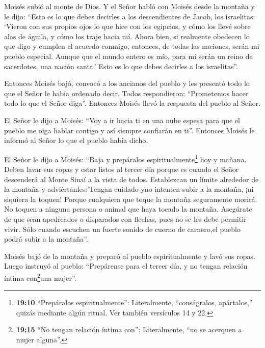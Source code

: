  Moisés subió al monte de Dios. Y el Señor habló con Moisés
desde la montaña y le dijo: ``Esto es lo que debes decirles a los
descendientes de Jacob, los israelitas:  `Vieron con sus
propios ojos lo que hice con los egipcios, y cómo los llevé sobre alas
de águila, y cómo los traje hacia mí.  Ahora bien, si
realmente obedecen lo que digo y cumplen el acuerdo conmigo, entonces,
de todas las naciones, serán mi pueblo especial. Aunque que el mundo
entero es mío,  para mí serán un reino de sacerdotes, una
nación santa.' Esto es lo que debes decirles a los israelitas''.

 Entonces Moisés bajó, convocó a los ancianos del pueblo y
les presentó todo lo que el Señor le había ordenado decir. 
Todos respondieron: ``Prometemos hacer todo lo que el Señor diga''.
Entonces Moisés llevó la respuesta del pueblo al Señor.

 El Señor le dijo a Moisés: ``Voy a ir hacia ti en una nube
espesa para que el pueblo me oiga hablar contigo y así siempre confiarán
en ti''. Entonces Moisés le informó al Señor lo que el pueblo había
dicho.

 El Señor le dijo a Moisés: ``Baja y prepáralos
espiritualmente\footnote{\textbf{19:10} ``Prepáralos espiritualmente'':
  Literalmente, ``conságralos, apártalos,'' quizás mediante algún
  ritual. Ver también versículos 14 y 22.} hoy y mañana. Deben lavar sus
ropas  y estar listos al tercer día porque es cuando el
Señor descenderá al Monte Sinaí a la vista de todos. 
Establezcan un límite alrededor de la montaña y adviértanles:'Tengan
cuidado yno intenten subir a la montaña, ¡ni siquiera la toquen! Porque
cualquiera que toque la montaña seguramente morirá. No toquen a ninguna
persona o animal que haya tocado la montaña.  Asegúrate de
que sean apedreados o disparados con flechas, pues no se les debe
permitir vivir. Sólo cuando escuchen un fuerte sonido de cuerno de
carnero,el pueblo podrá subir a la montaña''.

 Moisés bajó de la montaña y preparó al pueblo
espiritualmente y lavó sus ropas.  Luego instruyó al
pueblo: ``Prepárense para el tercer día, y no tengan relación íntima
con\footnote{\textbf{19:15} ``No tengan relación íntima con'':
  Literalmente, ``no se acerquen a mujer alguna''.}una mujer''.

